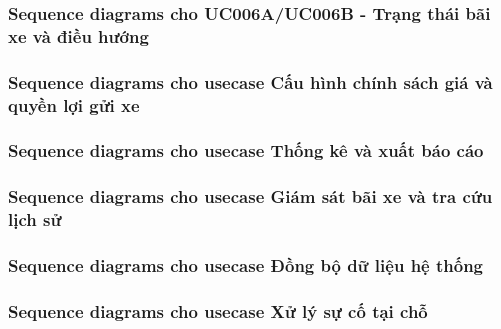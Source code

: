  

\newpage

\subsubsection{Sequence diagrams cho UC006A/UC006B - Trạng thái bãi xe và điều hướng}




\newpage

\subsubsection{Sequence diagrams cho usecase Cấu hình chính sách giá và quyền lợi gửi xe}




\newpage


\subsubsection{Sequence diagrams cho usecase Thống kê và xuất báo cáo}




\newpage


\subsubsection{Sequence diagrams cho usecase Giám sát bãi xe và tra cứu lịch sử}



\newpage


\subsubsection{Sequence diagrams cho usecase Đồng bộ dữ liệu hệ thống}


\newpage


\subsubsection{Sequence diagrams cho usecase Xử lý sự cố tại chỗ}



